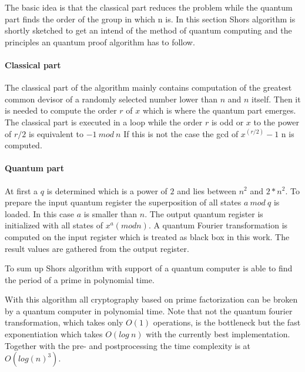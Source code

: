 The basic idea is that the classical part reduces the problem while the quantum part finds the order of the group in which n is. 
In this section Shors algorithm is shortly sketched to get an intend of the method of quantum computing and the principles an quantum proof algorithm has to follow. 
\paragraph{Classical part}
The classical part of the algorithm mainly contains computation of the greatest common devisor of a randomly selected number lower than $n$ and $n$ itself. Then it is needed to compute the order $r$ of $x$ which is where the quantum part emerges. The classical part is executed in a loop while the order $r$ is odd or $x$ to the power of $r/2$ is equivalent to $-1\: mod\:n$  
If this is not the case the gcd of $x^{(r / 2)} -1$ n is computed.
\paragraph{Quantum part}
At first a $q$ is determined which is a power of $2$ and lies between $n^2$ and $2*n^2$. 
To prepare the input quantum register the superposition of all states $a\: mod\: q$ is loaded. In this case $a$ is smaller than $n$.
The output quantum register is initialized with all states of $x^a(mod n)$. 
A quantum Fourier transformation is computed on the input register which is treated as black box in this work. 
The result values are gathered from the output register. 

To sum up Shors algorithm with support of a quantum computer is able to find the period of a prime in polynomial time. 

With this algorithm all cryptography based on prime factorization can be broken by a quantum computer in polynomial time. Note that not the quantum fourier transformation, which takes only $O(1)$ operations, is the bottleneck but  the fast exponentiation which takes $O(log\: n)$ with the currently best implementation\cite{markov2012constant}. Together with the pre- and  postprocessing the time complexity is at $O(log(n)^3)$.


